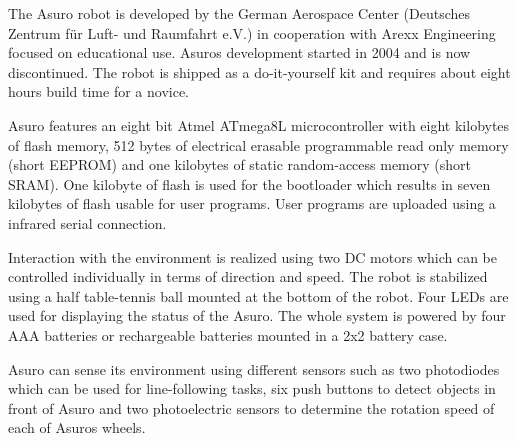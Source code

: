 \documentclass[11pt,a4paper]{article}
\begin{document}
The Asuro robot is developed by the German Aerospace Center (Deutsches Zentrum für Luft- und Raumfahrt e.V.) in cooperation with Arexx Engineering focused on educational use. Asuros development started in 2004 and is now discontinued. The robot is shipped as a do-it-yourself kit and requires about eight hours build time for a novice. 

Asuro features an eight bit Atmel ATmega8L microcontroller with eight kilobytes of flash memory, 512 bytes of electrical erasable programmable read only memory (short EEPROM) and one kilobytes of static random-access memory (short SRAM). One kilobyte of flash is used for the bootloader which results in seven kilobytes of flash usable for user programs. User programs are uploaded using a infrared serial connection.

Interaction with the environment is realized using two DC motors which can be controlled individually in terms of direction and speed. The robot is stabilized using a half table-tennis ball mounted at the bottom of the robot. Four LEDs are used for displaying the status of the Asuro. The whole system is powered by four AAA batteries or rechargeable batteries mounted in a 2x2 battery case. 

Asuro can sense its environment using different sensors such as two photodiodes which can be used for line-following tasks, six push buttons to detect objects in front of Asuro and two photoelectric sensors to determine the rotation speed of each of Asuros wheels.
\end{document}
